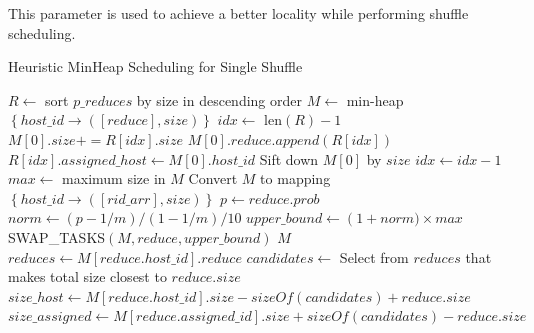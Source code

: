 This parameter is used to achieve a better locality while performing shuffle scheduling.

\begin{minipage}{\columnwidth}
\begin{algorithm}[H]
\caption{Heuristic MinHeap Scheduling for Single Shuffle}
\label{hminheap}
	\begin{algorithmic}[1]
	\small
		\State $R\gets$ sort $p\_reduces$ by size in descending order
		\State $M\gets$ min-heap $\left\{ host\_id \rightarrow \left( \left[ reduce \right], size \right) \right\}$
		\State $idx\gets$ len$\left(R\right) - 1$
		\State $M\left[0\right].size += R\left[idx\right].size$
		\State $M\left[0\right].reduce.append\left(R\left[idx\right]\right)$
		\State $R\left[idx\right].assigned\_host \gets M \left[0\right].host\_id$
		\State Sift down $M\left[0\right]$ by $size$
		\State $idx\gets idx-1$
		\EndWhile
		\State $max\gets$ maximum size in $M$
		\State Convert $M$ to mapping $\left\{ host\_id \rightarrow \left( \left[ rid\_arr \right], size \right) \right\}$
				\State $p\gets reduce.prob$
				\State $norm\gets \left(p-1/m\right)/\left(1-1/m\right)/10$
				\State $upper\_bound \gets \left(1 + norm) \times max$
				\State SWAP\_TASKS$\left(M, reduce, upper\_bound\right)$
			\EndIf
		\EndFor
		\Return $M$
	\EndProcedure
		\State $reduces \gets M\left[reduce.host\_id\right].reduce$	
		\State $candidates \gets$ Select from $reduces$ that makes total size closest to $reduce.size$
		\State $size\_host \gets M\left[reduce.host\_id\right].size - sizeOf\left(candidates\right) + reduce.size$
		\State $size\_assigned \gets M\left[reduce.assigned\_id\right].size + sizeOf\left(candidates\right) - reduce.size$
		\EndIf
	\EndProcedure
	\end{algorithmic}
\end{algorithm}
\end{minipage}


